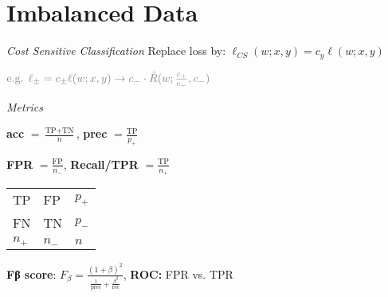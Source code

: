 \section{Imbalanced Data}

\emph{Cost Sensitive Classification}
Replace loss by: $\ell_{CS}(w;x,y) = c_y \ell(w;x,y)$

$\color{gray} \text{e.g. } \ell_{\pm} = c_\pm \ell(w;x,y)
\to c_-\cdot \hat R(w; \frac{c_+}{c_-},c_-)$

\emph{Metrics}

\begin{minipage}{.7\linewidth}
	\textbf{acc} $= \frac{\textrm{TP}+\textrm{TN}}{n}$,
	\textbf{prec} $= \frac{\textrm{TP}}{p_+}$
	
	\textbf{FPR} $= \frac{\textrm{FP}}{n_-}$,
	\textbf{Recall/TPR} $= \frac{\textrm{TP}}{n_+}$
\end{minipage}%
\begin{minipage}{.3\linewidth}
	\begin{tabular}{@{}l @{ }l | @{ }l}
		TP & FP & $p_+$\\
		FN & TN & $p_-$\\\hline
		$n_+$ & $n_-$ & $n$
	\end{tabular}
\end{minipage}

\textbf{Fβ score}: $F_\beta = \frac{(1+\beta)^2}{\frac{1}{\textrm{prec}} + \frac{\beta^2}{\textrm{rec}}}$,
\enskip
\textbf{ROC:} FPR vs. TPR
